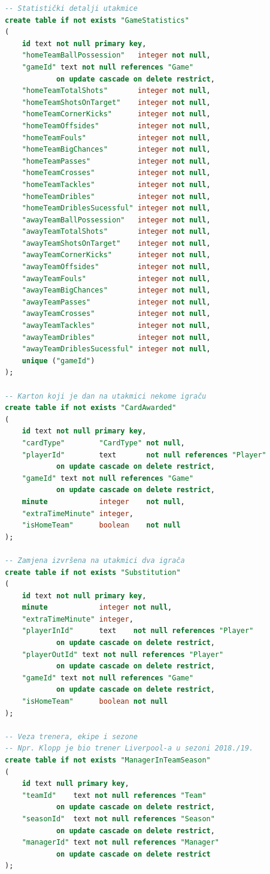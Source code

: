 \documentclass[times, utf8, zavrsni]{fer}
\begin{document}
\begin{lstlisting}[caption=Model baze podataka, language=SQL, numbers=none]
-- Statistički detalji utakmice
create table if not exists "GameStatistics"
(
    id text not null primary key,
    "homeTeamBallPossession"   integer not null,
    "gameId" text not null references "Game"
            on update cascade on delete restrict,
    "homeTeamTotalShots"       integer not null,
    "homeTeamShotsOnTarget"    integer not null,
    "homeTeamCornerKicks"      integer not null,
    "homeTeamOffsides"         integer not null,
    "homeTeamFouls"            integer not null,
    "homeTeamBigChances"       integer not null,
    "homeTeamPasses"           integer not null,
    "homeTeamCrosses"          integer not null,
    "homeTeamTackles"          integer not null,
    "homeTeamDribles"          integer not null,
    "homeTeamDriblesSucessful" integer not null,
    "awayTeamBallPossession"   integer not null,
    "awayTeamTotalShots"       integer not null,
    "awayTeamShotsOnTarget"    integer not null,
    "awayTeamCornerKicks"      integer not null,
    "awayTeamOffsides"         integer not null,
    "awayTeamFouls"            integer not null,
    "awayTeamBigChances"       integer not null,
    "awayTeamPasses"           integer not null,
    "awayTeamCrosses"          integer not null,
    "awayTeamTackles"          integer not null,
    "awayTeamDribles"          integer not null,
    "awayTeamDriblesSucessful" integer not null,
    unique ("gameId")
);

-- Karton koji je dan na utakmici nekome igraču
create table if not exists "CardAwarded"
(
    id text not null primary key,
    "cardType"        "CardType" not null,
    "playerId"        text       not null references "Player"
            on update cascade on delete restrict,
    "gameId" text not null references "Game"
            on update cascade on delete restrict,
    minute            integer    not null,
    "extraTimeMinute" integer,
    "isHomeTeam"      boolean    not null
);

-- Zamjena izvršena na utakmici dva igrača
create table if not exists "Substitution"
(
    id text not null primary key,
    minute            integer not null,
    "extraTimeMinute" integer,
    "playerInId"      text    not null references "Player"
            on update cascade on delete restrict,
    "playerOutId" text not null references "Player"
            on update cascade on delete restrict,
    "gameId" text not null references "Game"
            on update cascade on delete restrict,
    "isHomeTeam"      boolean not null
);

-- Veza trenera, ekipe i sezone
-- Npr. Klopp je bio trener Liverpool-a u sezoni 2018./19.
create table if not exists "ManagerInTeamSeason"
(
    id text null primary key,
    "teamId"    text not null references "Team"
            on update cascade on delete restrict,
    "seasonId"  text not null references "Season"
            on update cascade on delete restrict,
    "managerId" text not null references "Manager"
            on update cascade on delete restrict
);
\end{lstlisting}
\end{document}

